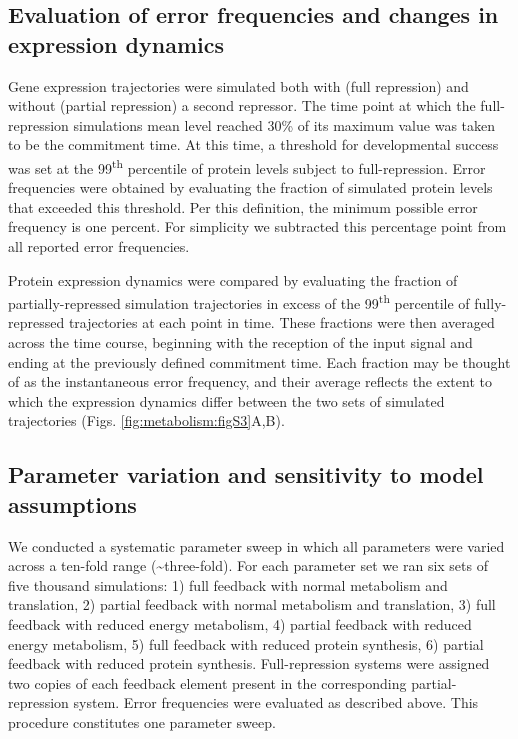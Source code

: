 \subsection{Evaluation of error frequencies and changes in expression dynamics}
\label{appendix:supp:metabolism:model:scoring}

Gene expression trajectories were simulated both with (full repression) and without (partial repression) a second repressor. The time point at which the full-repression simulations mean level reached 30\% of its maximum value was taken to be the commitment time. At this time, a threshold for developmental success was set at the 99\textsuperscript{th} percentile of protein levels subject to full-repression. Error frequencies were obtained by evaluating the fraction of simulated protein levels that exceeded this threshold. Per this definition, the minimum possible error frequency is one percent. For simplicity we subtracted this percentage point from all reported error frequencies.

Protein expression dynamics were compared by evaluating the fraction of partially-repressed simulation trajectories in excess of the 99\textsuperscript{th} percentile of fully-repressed trajectories at each point in time. These fractions were then averaged across the time course, beginning with the reception of the input signal and ending at the previously defined commitment time. Each fraction may be thought of as the instantaneous error frequency, and their average reflects the extent to which the expression dynamics differ between the two sets of simulated trajectories (Figs. \ref{fig:metabolism:figS3}A,B).

\subsection{Parameter variation and sensitivity to model assumptions}
\label{appendix:supp:metabolism:model:sweeps}

We conducted a systematic parameter sweep in which all parameters were varied across a ten-fold range (\pm \textasciitilde{}three-fold). For each parameter set we ran six sets of five thousand simulations: 1) full feedback with normal metabolism and translation, 2) partial feedback with normal metabolism and translation, 3) full feedback with reduced energy metabolism, 4) partial feedback with reduced energy metabolism, 5) full feedback with reduced protein synthesis, 6) partial feedback with reduced protein synthesis. Full-repression systems were assigned two copies of each feedback element present in the corresponding partial-repression system. Error frequencies were evaluated as described above. This procedure constitutes one parameter sweep.

